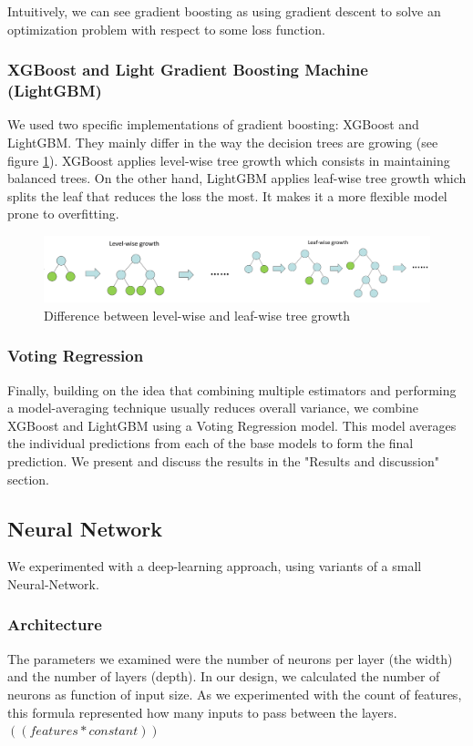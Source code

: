 \documentclass[sigplan,screen]{acmart}
\begin{document}
Intuitively, we can see gradient boosting as using gradient descent to solve an optimization problem with respect to some loss function.

\subsubsection{XGBoost and Light Gradient Boosting Machine (LightGBM)}
We used two specific implementations of gradient boosting: XGBoost and LightGBM. They mainly differ in the way the decision trees are growing (see figure \ref{tree_growth}). XGBoost applies level-wise tree growth which consists in maintaining balanced trees. On the other hand, LightGBM applies leaf-wise tree growth which splits the leaf that reduces the loss the most. It makes it a more flexible model prone to overfitting.
\begin{figure}[H]
\centering
\includegraphics[width=\columnwidth]{leaf_level_wise.png}
\caption{Difference between level-wise and leaf-wise tree growth \cite{keitakurita_2019}}\label{tree_growth}
\end{figure}
\subsubsection{Voting Regression}
Finally, building on the idea that combining multiple estimators and performing a model-averaging technique usually reduces overall variance, we combine XGBoost and LightGBM using a Voting Regression model. This model averages the individual predictions from each of the base models to form the final prediction. We present and discuss the results in the "Results and discussion" section.

\subsection{Neural Network}
We experimented with a deep-learning approach, using variants of a small Neural-Network.  

\subsubsection{Architecture}
The parameters we examined were the number of neurons per layer (the width) and the number of layers (depth). In our design, we calculated the number of neurons as  function of input size. As we experimented with the count of features, this formula represented how many inputs to pass between the layers. $((features*constant))$
\end{document}
